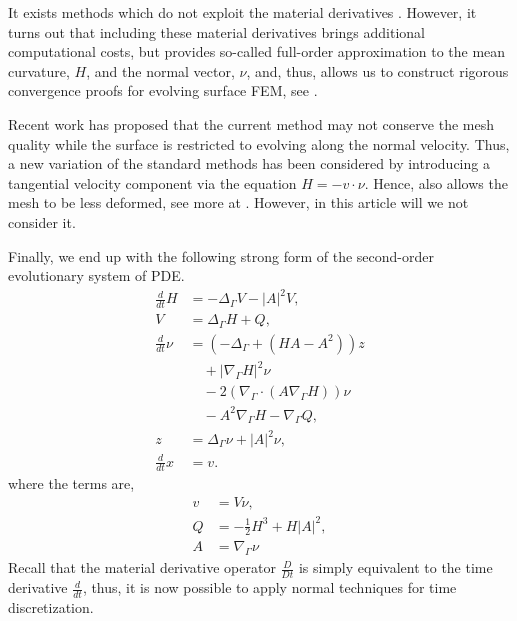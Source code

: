 It exists methods which do not exploit the material derivatives \cite{bonito2010parametric, bartezzaghi2016isogeometric}. However, it turns out that including these material derivatives brings additional computational costs, but provides so-called full-order
approximation to the mean curvature, $H$, and the normal vector, $\nu $, and, thus, allows us to construct rigorous convergence proofs for evolving surface FEM, see \cite{kovacs2021convergent, binz2022convergent}.

Recent work has proposed that the current method may not conserve the mesh quality while the surface is restricted to evolving along the normal velocity. Thus, a new variation of the standard methods has been considered by introducing a tangential
velocity component via the equation  $H = - v\cdot \nu  $. Hence, also allows the mesh to be less deformed, see more at \cite{hu2022evolving}. However, in this article will we not consider it.

Finally, we end up with the following strong form of the second-order evolutionary system of PDE.
\begin{subequations}
    \label{eq:WE_strong_form}
    \begin{align}
\frac{d}{dt}H & = -  \Delta _{\Gamma }V - \left\lvert A \right\rvert ^2 V    , \\
V  & =   \Delta _{\Gamma } H + Q, \label{eq:WE_strong_form_V} \\
\frac{d}{dt} \nu & = \left( -\Delta _{\Gamma } + \left( HA - A^2 \right)  \right) z \nonumber \\
& \quad   + \left\lvert \nabla _{\Gamma } H \right\rvert ^2   \nu \nonumber  \\
 & \quad - 2\left( \nabla _{\Gamma }\cdot \left( A \nabla _{\Gamma } H \right)  \right) \nu \nonumber  \\
  & \quad  -A^2 \nabla _{\Gamma } H  - \nabla _{\Gamma } Q, \\
z & = \Delta  _{\Gamma } \nu  + \left\lvert A \right\rvert ^2 \nu,\label{eq:WE_strong_form_z}\\
\frac{d}{dt} x  &= v.
    \end{align}
\end{subequations}
where the terms are,
\[
    \begin{split}
v & = V\nu, \\
Q & =  - \frac{1}{2} H^{3} + H \left\lvert A \right\rvert^2, \\
A & = \nabla _{\Gamma } \nu
    \end{split}
\]
Recall that the material derivative operator $\frac{D}{Dt} $ is simply equivalent to the time derivative $\frac{d}{dt}$, thus, it is now possible to apply normal techniques for time discretization.


